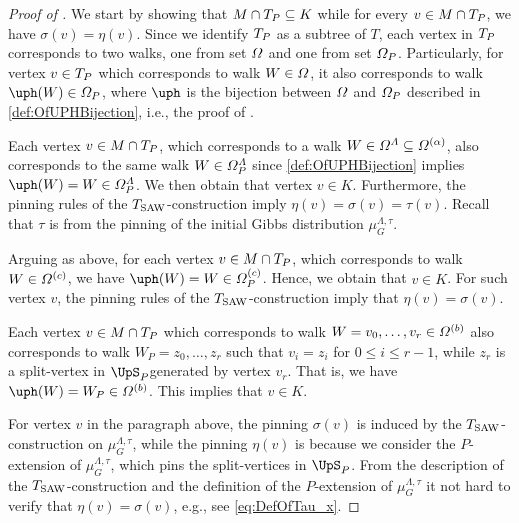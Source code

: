 \documentclass[11pt,reqno]{amsart}
\numberwithin{equation}{section}
\newcommand{\blue}[1]{{\color{blue}#1}}
\newcommand{\bluepigment}[1]{{\color{blue(pigment)}#1}}
\newcommand{\bostonuniversityred}[1]{{\color{bostonuniversityred}#1}}
\newcommand{\capri}[1]{{\color{capri}#1}}
\newcommand{\cadmiumgreen}[1]{{\color{cadmiumgreen}#1}}
\newcommand{\electricviolet}[1]{{\color{electricviolet}#1}}
\newcommand{\goldenbrown}[1]{{\color{goldenbrown}#1}}
\newcommand{\red}[1]{{\color{red}#1}}
\newcommand{\Tsaw}{T_{\rm SAW}}
\renewcommand{\blue}[1]{#1}
\renewcommand{\bluepigment}[1]{#1}
\renewcommand{\bostonuniversityred}[1]{#1}
\renewcommand{\capri}[1]{#1}
\renewcommand{\cadmiumgreen}[1]{#1}
\renewcommand{\electricviolet}[1]{#1}
\renewcommand{\goldenbrown}[1]{#1}
\renewcommand{\red}[1]{#1}
\newcommand{\ki}{\capri{i}}
\newcommand{\kK}{\bluepigment{K}}
\newcommand{\kP}{\goldenbrown{P}}
\newcommand{\kr}{\bostonuniversityred{r}}%
\newcommand{\kv}{\electricviolet{v}}
\newcommand{\kW}{\blue{W}}
\newcommand{\kz}{\cadmiumgreen{z}}
\renewcommand{\ki}{i}
\renewcommand{\kK}{K}
\renewcommand{\kP}{P}
\renewcommand{\kr}{r}
\renewcommand{\kv}{v}
\renewcommand{\kW}{W}
\renewcommand{\kz}{z}
\begin{document}
\begin{proof}[Proof of ]
We start by showing that $M\cap \XTPw \subseteq \kK$ while for every $\kv\in M\cap \XTPw$, we have $\sigma(\kv)=\eta(\kv)$. 
%
Since we identify  $\XTPw$ as a subtree of $T$, each vertex in $\XTPw$ corresponds to two walks, one from set 
$\Omega$ and one from set $\sawpaths_{\kP}$. Particularly, for vertex $\kv\in \XTPw$ which corresponds to  walk 
$\kW\in \sawpaths$, it also corresponds to walk $\ABijection(\kW)\in \sawpaths_{\kP}$, where $\ABijection$ is the  bijection between 
$\Omega$ and $\sawpaths_{\kP}$ described in \eqref{def:OfUPHBijection}, i.e.,  the proof of .




Each vertex $\kv\in M\cap \XTPw$, which corresponds to a walk $\kW\in \sawpaths^{\Lambda}\subseteq \sawpaths^{(\alpha)}$,  also corresponds to 
the same  walk $\kW\in \sawpaths^{\Lambda}_P$ since \eqref{def:OfUPHBijection} implies $\ABijection(\kW)=\kW\in \sawpaths^{\Lambda}_{\kP}$.
We then obtain that vertex $\kv\in \kK$. Furthermore,  the pinning rules of the $\Tsaw$-construction 
imply  $\eta(\kv)=\sigma(\kv)=\tau(\kv)$. Recall that $\tau$ is from the pinning of the initial Gibbs distribution $\mu^{\Lambda,\tau}_G$. 




Arguing as above,  for each vertex $\kv\in M\cap \XTPw$, which corresponds to walk $\kW\in \sawpaths^{(c)}$, 
we have $\ABijection(\kW)=\kW\in \sawpaths^{(c)}_{\kP}$. Hence, we obtain that $\kv\in \kK$.  For such vertex $\kv$, 
the pinning rules of the $\Tsaw$-construction imply that $\eta(\kv)=\sigma(\kv)$.



Each vertex $\kv\in M\cap \XTPw$ which corresponds to walk $\kW=\kv_0, \ldots, \kv_{\kr} \in \sawpaths^{(b)}$  also 
corresponds to walk $\kW_{\kP}=\kz_0, \ldots, \kz_{\kr}$ such that $\kv_{\ki}=\kz_{\ki}$ for $0\leq \ki \leq \kr-1$,  while 
$\kz_{\kr}$ is a split-vertex in $\ssplit_{\kP} $generated by vertex $\kv_{\kr}$. That is, we have $\ABijection(\kW)=\kW_{\kP}\in \sawpaths^{(b)}$.
This  implies that $\kv\in \kK$.




For vertex $\kv$ in the paragraph above, the pinning $\sigma(\kv)$ is induced by the $\Tsaw$-construction on $\mu^{\Lambda,\tau}_G$, while
the pinning $\eta(\kv)$ is because we consider the $\kP$-extension of $\mu^{\Lambda,\tau}_G$,  which pins the split-vertices in $\ssplit_{\kP}$. 
%
From the description of the $\Tsaw$-construction and the definition of the $\kP$-extension of $\mu^{\Lambda,\tau}_{G}$ it not hard to verify that 
$\eta(\kv)=\sigma(\kv)$, e.g., see \eqref{eq:DefOfTau_x}. 




\end{proof}
\end{document}
